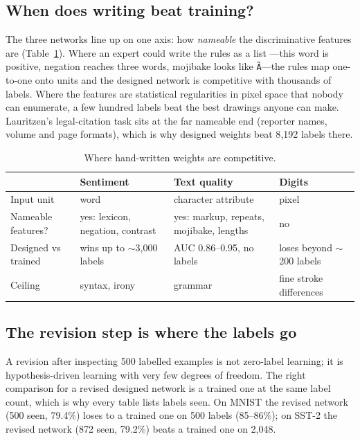 \subsection{When does writing beat training?}
The three networks line up on one axis: how \emph{nameable} the discriminative
features are (Table~\ref{tab:when}). Where an expert could write the rules as a list
---this word is positive, negation reaches three words, mojibake looks like
\texttt{\~A\textparagraph}---the rules map one-to-one onto units and the designed
network is competitive with thousands of labels. Where the features are statistical
regularities in pixel space that nobody can enumerate, a few hundred labels beat the
best drawings anyone can make. Lauritzen's legal-citation task \cite{lauritzen2026}
sits at the far nameable end (reporter names, volume and page formats), which is why
designed weights beat 8{,}192 labels there.

\begin{table}[h]\centering\small
\begin{tabular}{lp{3.2cm}p{3.4cm}p{3.2cm}}\toprule
 & Sentiment & Text quality & Digits\\\midrule
Input unit & word & character attribute & pixel\\
Nameable features? & yes: lexicon, negation, contrast & yes: markup, repeats, mojibake, lengths & no\\
Designed vs trained & wins up to $\sim$3{,}000 labels & AUC 0.86--0.95, no labels & loses beyond $\sim$200 labels\\
Ceiling & syntax, irony & grammar & fine stroke differences\\
\bottomrule\end{tabular}
\caption{Where hand-written weights are competitive.}\label{tab:when}
\end{table}

\subsection{The revision step is where the labels go}
A revision after inspecting 500 labelled examples is not zero-label learning; it is
hypothesis-driven learning with very few degrees of freedom. The right comparison for a
revised designed network is a trained one at the same label count, which is why every
table lists labels seen. On MNIST the revised network (500 seen, 79.4\%) loses to a
trained one on 500 labels (85--86\%); on SST-2 the revised network (872 seen, 79.2\%)
beats a trained one on 2{,}048.

